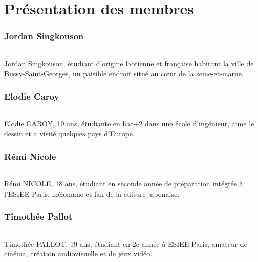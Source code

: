 \part{Présentation des membres}
\section{Jordan Singkouson}
\paragraph{}
Jordan Singkouson, étudiant d’origine laotienne et française habitant la ville de Bussy-Saint-Georges, un paisible endroit situé au cœur de la seine-et-marne. 

\section{Elodie Caroy}
\paragraph{}
Elodie CAROY, 19 ans, étudiante en bac+2 dans une école d’ingénieur, aime le dessin et a visité quelques pays d’Europe.

\section{Rémi Nicole}
\paragraph{}
Rémi NICOLE, 18 ans, étudiant en seconde année de préparation intégrée à l’ESIEE Paris, mélomane et fan de la culture japonaise.

\section{Timothée Pallot}
\paragraph{}
Timothée PALLOT, 19 ans, étudiant en 2e année à ESIEE Paris, amateur de cinéma, création audiovisuelle et de jeux vidéo.
